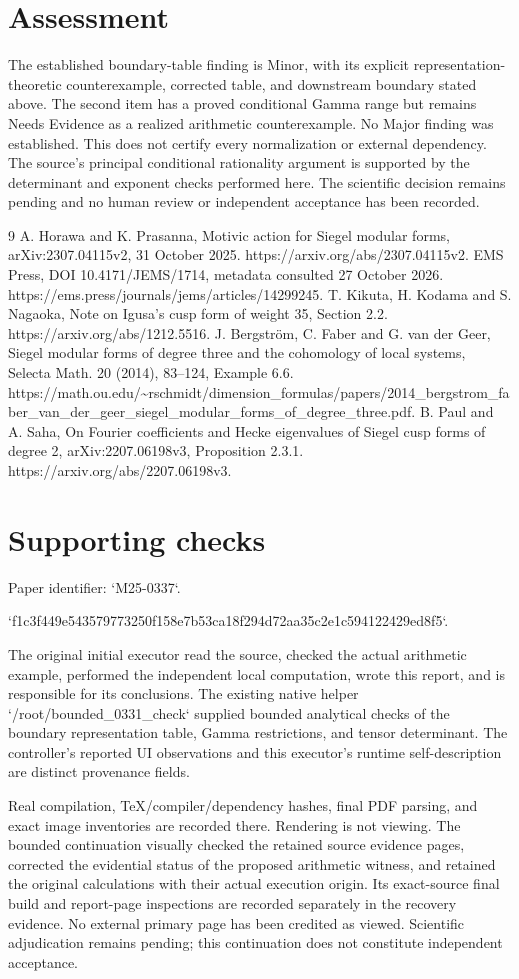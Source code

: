 \documentclass[10pt]{article}
\begin{document}
\section*{Assessment}
The established boundary-table finding is Minor, with its explicit representation-theoretic counterexample, corrected table, and downstream boundary stated above. The second item has a proved conditional Gamma range but remains Needs Evidence as a realized arithmetic counterexample. No Major finding was established. This does not certify every normalization or external dependency. The source’s principal conditional rationality argument is supported by the determinant and exponent checks performed here. The scientific decision remains pending and no human review or independent acceptance has been recorded.\par
9 A. Horawa and K. Prasanna, Motivic action for Siegel modular forms, arXiv:2307.04115v2, 31 October 2025. https://arxiv.org/abs/2307.04115v2. EMS Press, DOI 10.4171/JEMS/1714, metadata consulted 27 October 2026. https://ems.press/journals/jems/articles/14299245. T. Kikuta, H. Kodama and S. Nagaoka, Note on Igusa’s cusp form of weight 35, Section 2.2. https://arxiv.org/abs/1212.5516. J. Bergström, C. Faber and G. van der Geer, Siegel modular forms of degree three and the cohomology of local systems, Selecta Math. 20 (2014), 83–124, Example 6.6. https://math.ou.edu/\textasciitilde{}rschmidt/dimension\_formulas/papers/2014\_bergstrom\_faber\_van\_der\_geer\_siegel\_modular\_forms\_of\_degree\_three.pdf. B. Paul and A. Saha, On Fourier coefficients and Hecke eigenvalues of Siegel cusp forms of degree 2, arXiv:2207.06198v3, Proposition 2.3.1. https://arxiv.org/abs/2207.06198v3.\par
\section*{Supporting checks}
Paper identifier: `M25-0337`.\par
`f1c3f449e543579773250f158e7b53ca18f294d72aa35c2e1c594122429ed8f5`.\par
The original initial executor read the source, checked the actual arithmetic example, performed the independent local computation, wrote this report, and is responsible for its conclusions. The existing native helper `/root/bounded\_0331\_check` supplied bounded analytical checks of the boundary representation table, Gamma restrictions, and tensor determinant. The controller’s reported UI observations and this executor’s runtime self-description are distinct provenance fields.\par
Real compilation, TeX/compiler/dependency hashes, final PDF parsing, and exact image inventories are recorded there. Rendering is not viewing. The bounded continuation visually checked the retained source evidence pages, corrected the evidential status of the proposed arithmetic witness, and retained the original calculations with their actual execution origin. Its exact-source final build and report-page inspections are recorded separately in the recovery evidence. No external primary page has been credited as viewed. Scientific adjudication remains pending; this continuation does not constitute independent acceptance.\par
\end{document}
